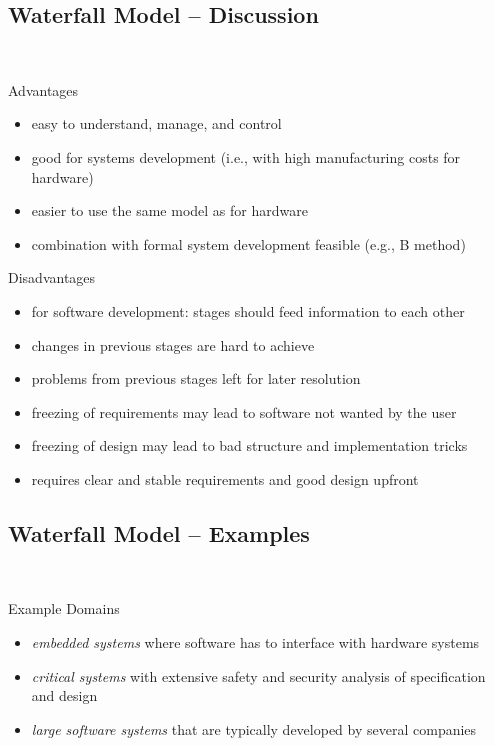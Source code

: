 \subsection{Waterfall Model -- Discussion}
\begin{frame}{\insertsubsection\ \mytitlesource{\sommerville}}
	\begin{fancycolumns}
		\begin{note}{Advantages}
			\begin{itemize}
				\item easy to understand, manage, and control
				\item good for systems development (i.e., with high manufacturing costs for hardware)
				\item easier to use the same model as for hardware
				\item combination with formal system development feasible (e.g., B method)
			\end{itemize}
		\end{note}
		\nextcolumn
		\begin{note}{Disadvantages}
				\begin{itemize}
					\item for software development: stages should feed information to each other
					\item changes in previous stages are hard to achieve
					\item problems from previous stages left for later resolution
					\item freezing of requirements may lead to software not wanted by the user
					\item freezing of design may lead to bad structure and implementation tricks
					\item requires clear and stable requirements and good design upfront
				\end{itemize}
		\end{note}
	\end{fancycolumns}
\end{frame}

\subsection{Waterfall Model -- Examples}
\begin{frame}{\insertsubsection\ \mytitlesource{\sommerville}}
	\begin{fancycolumns}[animation=none]
		\begin{example}{Example Domains}
				\begin{itemize}
					\item \emph{embedded systems} where software has to interface with hardware systems
					\item \emph{critical systems} with extensive safety and security analysis of specification and design
					\item \emph{large software systems} that are typically developed by several companies
				\end{itemize}
		\end{example}
		\nextcolumn
		\pic[width=\linewidth]{misc/lawn-mower-cropped}
	\end{fancycolumns}
\end{frame}

